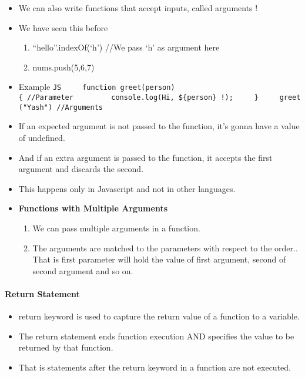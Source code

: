 \documentclass[
  paper=a4,
  ,captions=tableheading
]{scrartcl}
\providecommand{\tightlist}{%
  \setlength{\itemsep}{0pt}\setlength{\parskip}{0pt}}
\begin{document}
\begin{itemize}
\tightlist
\item
  We can also write functions that accept inputs, called arguments !
\item
  We have seen this before

  \begin{enumerate}
  \def\labelenumi{\arabic{enumi}.}
  \tightlist
  \item
    ``hello''.indexOf(`h') //We pass `h' as argument here
  \item
    nums.push(5,6,7)
  \end{enumerate}
\item
  Example
  \texttt{JS\ \ \ \ \ function\ greet(person)\{\ //Parameter\ \ \ \ \ \ \ \ \ console.log(\textasciigrave{}Hi,\ \$\{person\}\ !\textasciigrave{});\ \ \ \ \ \}\ \ \ \ \ greet("Yash")\ //Arguments}
\item
  If an expected argument is not passed to the function, it's gonna have
  a value of undefined.
\item
  And if an extra argument is passed to the function, it accepts the
  first argument and discards the second.
\item
  This happens only in Javascript and not in other languages.
\item
  \textbf{Functions with Multiple Arguments}

  \begin{enumerate}
  \def\labelenumi{\arabic{enumi}.}
  \tightlist
  \item
    We can pass multiple arguments in a function.
  \item
    The arguments are matched to the parameters with respect to the
    order.. That is first parameter will hold the value of first
    argument, second of second argument and so on.
  \end{enumerate}
\end{itemize}

\hypertarget{return-statement}{%
\paragraph{Return Statement}\label{return-statement}}

\begin{itemize}
\tightlist
\item
  return keyword is used to capture the return value of a function to a
  variable.
\item
  The return statement ends function execution AND specifies the value
  to be returned by that function.
\item
  That is statements after the return keyword in a function are not
  executed.
\end{itemize}
\end{document}

